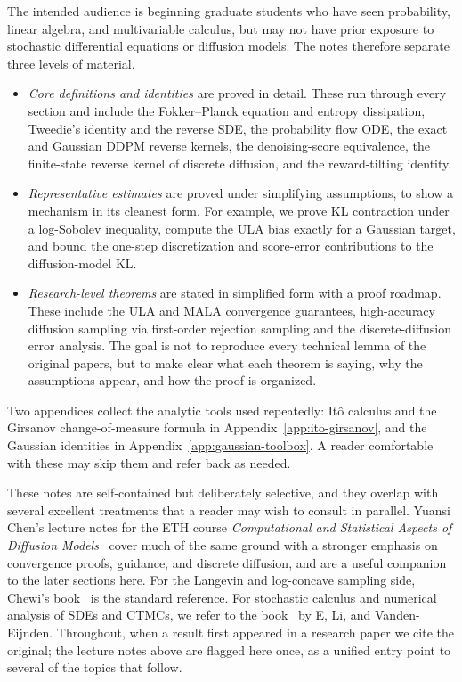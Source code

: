\documentclass{amsart}
\numberwithin{equation}{section}
\theoremstyle{plain}
\theoremstyle{definition}
\theoremstyle{remark}
\begin{document}
The intended audience is beginning graduate students who have seen probability,
linear algebra, and multivariable calculus, but may not have prior exposure to
stochastic differential equations or diffusion models.  The notes therefore
separate three levels of material.
\begin{itemize}
    \item \emph{Core definitions and identities} are proved in detail.  These
    run through every section and include the Fokker--Planck equation and
    entropy dissipation, Tweedie's identity and the reverse SDE, the
    probability flow ODE, the exact and Gaussian DDPM reverse kernels, the
    denoising-score equivalence, the finite-state reverse kernel of discrete
    diffusion, and the reward-tilting identity.
    \item \emph{Representative estimates} are proved under simplifying
    assumptions, to show a mechanism in its cleanest form.  For example, we
    prove KL contraction under a log-Sobolev inequality, compute the ULA bias
    exactly for a Gaussian target, and bound the one-step discretization and
    score-error contributions to the diffusion-model KL.
    \item \emph{Research-level theorems} are stated in simplified form with a
    proof roadmap.  These include the ULA and MALA convergence guarantees,
    high-accuracy diffusion sampling via first-order rejection sampling and the
    discrete-diffusion error analysis.  The goal is not to reproduce every
    technical lemma of the original papers, but to make clear what each theorem
    is saying, why the assumptions appear, and how the proof is organized.
\end{itemize}

Two appendices collect the analytic tools used repeatedly: It\^o calculus and
the Girsanov change-of-measure formula in Appendix~\ref{app:ito-girsanov}, and
the Gaussian identities in Appendix~\ref{app:gaussian-toolbox}.  A reader
comfortable with these may skip them and refer back as needed.

These notes are self-contained but deliberately selective, and they overlap
with several excellent treatments that a reader may wish to consult in
parallel.  Yuansi Chen's lecture notes for the ETH course \emph{Computational
and Statistical Aspects of Diffusion Models}~\cite{chen2026lecturenotes} cover
much of the same ground with a stronger emphasis on convergence proofs,
guidance, and discrete diffusion, and are a useful companion to the later
sections here.  For the Langevin and log-concave sampling side,
Chewi's book~\cite{chewi2024logconcave} is the standard reference. For stochastic calculus and numerical analysis of SDEs and CTMCs, we refer to the book~\cite{e2019appliedstochastic} by E, Li, and Vanden-Eijnden.  Throughout,
when a result first appeared in a research paper we cite the original; the
lecture notes above are flagged here once, as a unified entry point to several
of the topics that follow.
\end{document}
